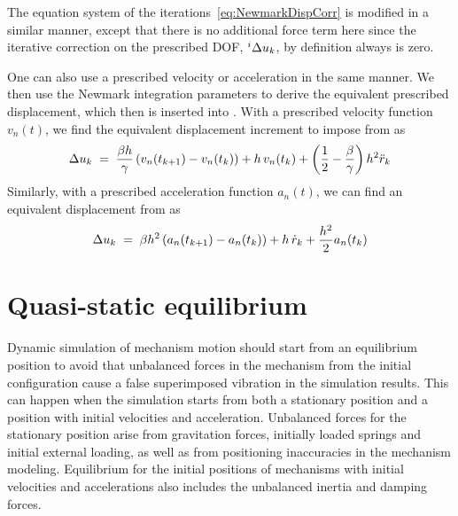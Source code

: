 The equation system of the iterations~\eqref{eq:NewmarkDispCorr} is modified in
a similar manner, except that there is no additional force term here since the
iterative correction on the prescribed DOF, ${}^{i}\Delta u_k$, by definition
always is zero.

One can also use a prescribed velocity or acceleration in the same manner.
We then use the Newmark integration parameters to derive the equivalent
prescribed displacement, which then is inserted into .
With a prescribed velocity function $v_n(t)$,
we find the equivalent displacement increment to impose from  as
%
\begin{equation}
\Delta u_k \;=\; \frac{\beta h}{\gamma}\left(v_n(t_\kp1) - v_n(t_k)\right) +
h\,v_n(t_k) + \left(\frac{1}{2}-\frac{\beta}{\gamma}\right)h^2 \ddot{r}_k
\end{equation}
%
Similarly, with a prescribed acceleration function $a_n(t)$,
we can find an equivalent displacement from  as
%
\begin{equation}
\Delta u_k \;=\; \beta h^2 \left(a_n(t_\kp1) - a_n(t_k)\right) +
h\,\dot{r}_k + \frac{h^2}{2}a_n(t_k)
\end{equation}


\clearpage
\section{Quasi-static equilibrium}
\label{s:Quasi-static equilibrium}

Dynamic simulation of mechanism motion should start from an equilibrium position
to avoid that unbalanced forces in the mechanism from the initial configuration
cause a false superimposed vibration in the simulation results.
This can happen when the simulation starts from both a stationary position and
a position with initial velocities and acceleration.
Unbalanced forces for the stationary position arise from gravitation forces,
initially loaded springs and initial external loading, as well as from
positioning inaccuracies in the mechanism modeling.
Equilibrium for the initial positions of mechanisms with initial velocities and
accelerations also includes the unbalanced inertia and damping forces.

